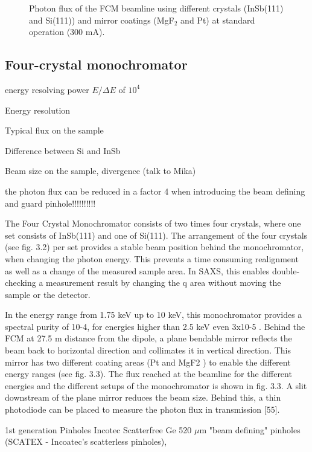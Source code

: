 \begin{figure}%
	\centering
		
		\caption{Photon flux of the FCM beamline using different crystals (InSb(111) and Si(111)) and mirror coatings (MgF$_2$ and Pt) at standard operation (300 mA).}
		\label{fig:FCMBeamlineFlux}
\end{figure}

\subsection{Four-crystal monochromator}
\label{sec:fcm}

energy resolving power \( E/\Delta E \) of \( 10^4 \)

Energy resolution

Typical flux on the sample

Difference between Si and InSb

Beam size on the sample, divergence (talk to Mika)

the photon flux can be reduced in a factor 4 when introducing the beam defining and guard pinhole!!!!!!!!!!

The Four Crystal Monochromator consists of two times four crystals, where one set consists of InSb(111) and one of Si(111). The arrangement of the four crystals (see fig. 3.2) per set provides a stable beam position behind the monochromator, when changing the photon energy. This prevents a time consuming realignment as well as a change of the measured sample area. In SAXS, this enables double-checking a measurement result by changing the q area without moving the sample or the detector.

In the energy range from 1.75 keV up to 10 keV, this monochromator provides a spectral purity of 10-4, for energies higher than 2.5 keV even 3x10-5 . Behind the FCM at 27.5 m distance from the dipole, a plane bendable mirror reflects the beam back to horizontal direction and collimates it in vertical direction. This mirror has two different coating areas (Pt and MgF2 ) to enable the different energy ranges (see fig. 3.3). The flux reached at the beamline for the different energies and the different setups of the monochromator is shown in fig. 3.3. A slit downstream of the plane mirror reduces the beam size. Behind this, a thin photodiode can be placed to measure the photon flux in transmission [55].

1st generation Pinholes Incotec Scatterfree Ge 520 $\mu$m "beam defining" pinholes (SCATEX - Incoatec's scatterless pinholes), 


